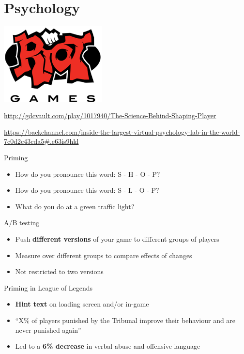 \part{Psychology}
\frame{\partpage}

\begin{frame}
	\begin{center}
		\includegraphics[width=0.4\textwidth]{riot_logo}
		
		\url{http://gdcvault.com/play/1017940/The-Science-Behind-Shaping-Player}
		
		\url{https://backchannel.com/inside-the-largest-virtual-psychology-lab-in-the-world-7c0d2c43cda5\#.e63is9hkl}
	\end{center}
\end{frame}

\begin{frame}{Priming}
	\begin{itemize}
		\pause\item How do you pronounce this word: S - H - O - P?
		\pause\item How do you pronounce this word: S - L - O - P?
		\pause\item What do you do at a green traffic light?
	\end{itemize}
\end{frame}

\begin{frame}{A/B testing}
	\begin{itemize}
		\pause\item Push \textbf{different versions} of your game to different groups of players
		\pause\item Measure over different groups to compare effects of changes
		\pause\item Not restricted to two versions
	\end{itemize}
\end{frame}

\begin{frame}{Priming in League of Legends}
	\begin{itemize}
		\pause\item \textbf{Hint text} on loading screen and/or in-game
		\pause\item ``X\% of players punished by the Tribunal improve their behaviour and are never punished again''
		\pause\item Led to a \textbf{6\% decrease} in verbal abuse and offensive language
	\end{itemize}
\end{frame}

